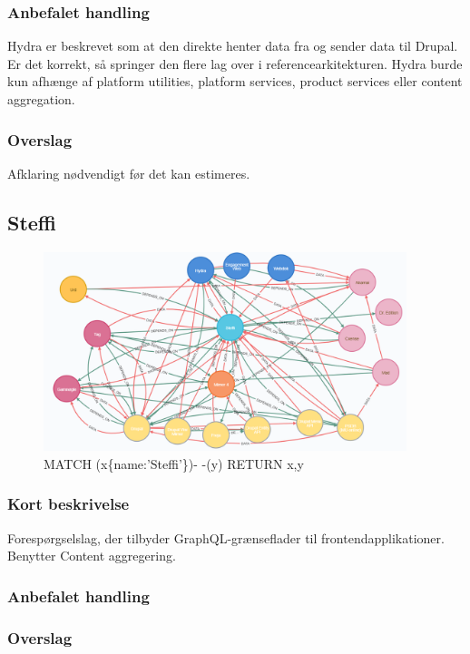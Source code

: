\documentclass{article}
\begin{document}
\subsubsection{Anbefalet handling}
Hydra er beskrevet som at den direkte henter data fra og sender data til Drupal. Er det korrekt, så springer den flere lag over i referencearkitekturen.
Hydra burde kun afhænge af platform utilities, platform services, product services eller content aggregation.
\subsubsection{Overslag}
Afklaring nødvendigt før det kan estimeres.


\subsection{Steffi}
\begin{figure}[h]
\includegraphics[width=300pt]{Steffi.PNG}
\caption{MATCH (x\{name:'Steffi'\})- -(y) RETURN x,y}
\end{figure}
\subsubsection{Kort beskrivelse}
Forespørgselslag, der tilbyder GraphQL-grænseflader til frontendapplikationer.
Benytter Content aggregering.
\subsubsection{Anbefalet handling}
\subsubsection{Overslag}
\end{document}
